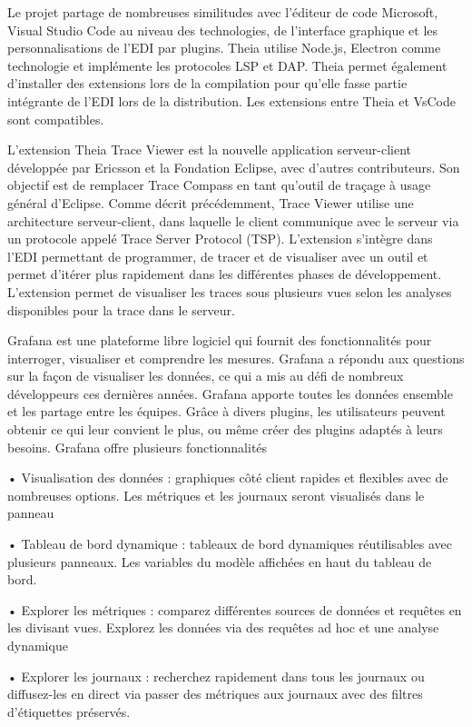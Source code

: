 Le projet partage de nombreuses similitudes avec l'éditeur de code Microsoft, Visual Studio Code au niveau des technologies, de l'interface graphique et les personnalisations de l'EDI par plugins. Theia utilise Node.js, Electron comme technologie et implémente les protocoles LSP et DAP. Theia permet également d'installer des extensions lors de la compilation pour qu'elle fasse partie intégrante de l'EDI lors de la distribution. Les extensions entre Theia et VsCode sont compatibles.

L'extension Theia Trace Viewer est la nouvelle application serveur-client développée par Ericsson et la Fondation Eclipse, avec d'autres contributeurs. Son objectif est de remplacer Trace Compass en tant qu'outil de traçage à usage général d'Eclipse. Comme décrit précédemment, Trace Viewer utilise une architecture serveur-client, dans laquelle le client communique avec le serveur via un protocole appelé Trace Server Protocol (TSP). \cite{desnoyers2006lttng} L'extension s'intègre dans l'EDI permettant de programmer, de tracer et de visualiser avec un outil et permet d'itérer plus rapidement dans les différentes phases de développement. L'extension permet de visualiser les traces sous plusieurs vues selon les analyses disponibles pour la trace dans le serveur.

Grafana est une plateforme libre logiciel qui fournit des fonctionnalités pour interroger, visualiser et comprendre les mesures. Grafana a répondu aux questions sur la façon de visualiser les données, ce qui a mis au défi de nombreux développeurs ces dernières années. Grafana apporte toutes les données ensemble et les partage entre les équipes. Grâce à divers plugins, les utilisateurs peuvent obtenir ce qui leur convient le plus, ou même créer des plugins adaptés à leurs besoins. Grafana offre plusieurs fonctionnalités 

• Visualisation des données : graphiques côté client rapides et flexibles avec de nombreuses options. Les métriques et les journaux seront visualisés dans le panneau

• Tableau de bord dynamique : tableaux de bord dynamiques réutilisables avec plusieurs panneaux. Les variables du modèle affichées en haut du tableau de bord.

• Explorer les métriques : comparez différentes sources de données et requêtes en les divisant vues. Explorez les données via des requêtes ad hoc et une analyse dynamique

• Explorer les journaux : recherchez rapidement dans tous les journaux ou diffusez-les en direct via passer des métriques aux journaux avec des filtres d'étiquettes préservés.

